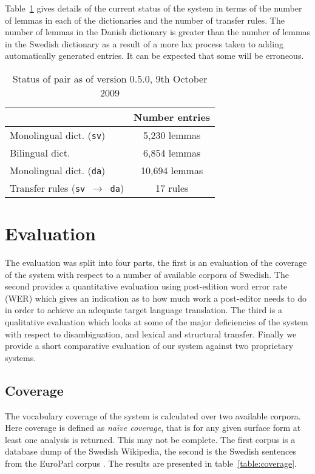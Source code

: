 \documentclass[11pt]{article}
\begin{document}
Table~\ref{table:status} gives details of the current status of the system
in terms of the number of lemmas in each of the dictionaries and the number 
of transfer rules. The number of lemmas in the Danish dictionary is greater 
than the number of lemmas in the Swedish dictionary as a result of a more 
lax process taken to adding automatically generated entries. It can be 
expected that some will be erroneous.

\begin{table}
\centering
\begin{tabular}{|l|c|}
\hline
                                           & Number entries\\
\hline
Monolingual dict. ({\tt sv})               & 5,230 lemmas \\
Bilingual dict.                            & 6,854 lemmas \\
Monolingual dict. ({\tt da})               & 10,694 lemmas \\
Transfer rules ({\tt sv $\rightarrow$ da}) & 17 rules \\
\hline
\end{tabular}
    \caption{Status of pair as of version 0.5.0, 9th October 2009}
    \label{table:status}
\end{table}


\section{Evaluation}

The evaluation was split into four parts, the first is an evaluation of the coverage
of the system with respect to a number of available corpora of Swedish. The second
provides a quantitative evaluation using post-edition word error rate (WER) which 
gives an indication as to how much work a post-editor needs to do in order to 
achieve an adequate target language translation. The third is a qualitative evaluation
which looks at some of the major deficiencies of the system with respect to disambiguation,
and lexical and structural transfer. Finally we provide a short comparative evaluation of
our system against two proprietary systems.

\subsection{Coverage}

The vocabulary coverage of the system is calculated over two available corpora. Here coverage
is defined as \emph{na\"ive coverage}, that is for any given surface form at least one analysis
is returned. This may not be complete. The first corpus is a database dump of the Swedish 
Wikipedia, the second is the Swedish sentences from the EuroParl corpus \cite{Koehn2005}. The 
results are presented in table~\ref{table:coverage}.
\end{document}
